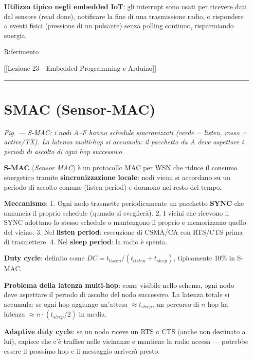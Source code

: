 \documentclass[
  italian,
  openany]{book}
\begin{document}
\textbf{Utilizzo tipico negli embedded IoT}: gli interrupt sono usati
per ricevere dati dal sensore (read done), notificare la fine di una
trasmissione radio, o rispondere a eventi fisici (pressione di un
pulsante) senza polling continuo, risparmiando energia.

\begin{calloutnote}{Riferimento}

{[}{[}Lezione 23 - Embedded Programming e Arduino{]}{]}

\end{calloutnote}

\begin{center}\rule{0.5\linewidth}{0.5pt}\end{center}

\section{SMAC (Sensor-MAC)}\label{smac-sensor-mac}

\emph{Fig. --- S-MAC: i nodi A--F hanno schedule sincronizzati (verde =
listen, rosso = active/TX). La latenza multi-hop si accumula: il
pacchetto da A deve aspettare i periodi di ascolto di ogni hop
successivo.}

\textbf{S-MAC} (\emph{Sensor MAC}) è un protocollo MAC per WSN che
riduce il consumo energetico tramite \textbf{sincronizzazione locale}:
nodi vicini si accordano su un periodo di ascolto comune (listen period)
e dormono nel resto del tempo.

\textbf{Meccanismo}: 1. Ogni nodo trasmette periodicamente un pacchetto
\textbf{SYNC} che annuncia il proprio schedule (quando si sveglierà). 2.
I vicini che ricevono il SYNC adottano lo stesso schedule o mantengono
il proprio e memorizzano quello del vicino. 3. Nel \textbf{listen
period}: esecuzione di CSMA/CA con RTS/CTS prima di trasmettere. 4. Nel
\textbf{sleep period}: la radio è spenta.

\textbf{Duty cycle}: definito come
\(DC = t_{listen} / (t_{listen} + t_{sleep})\), tipicamente 10\% in
S-MAC.

\textbf{Problema della latenza multi-hop}: come visibile nello schema,
ogni nodo deve aspettare il periodo di ascolto del nodo successivo. La
latenza totale si accumula: se ogni hop aggiunge un'attesa
\(\approx t_{sleep}\), un percorso di \(n\) hop ha latenza
\(\approx n \cdot (t_{sleep}/2)\) in media.

\textbf{Adaptive duty cycle}: se un nodo riceve un RTS o CTS (anche non
destinato a lui), capisce che c'è traffico nelle vicinanze e mantiene la
radio accesa --- potrebbe essere il prossimo hop e il messaggio arriverà
presto.
\end{document}
